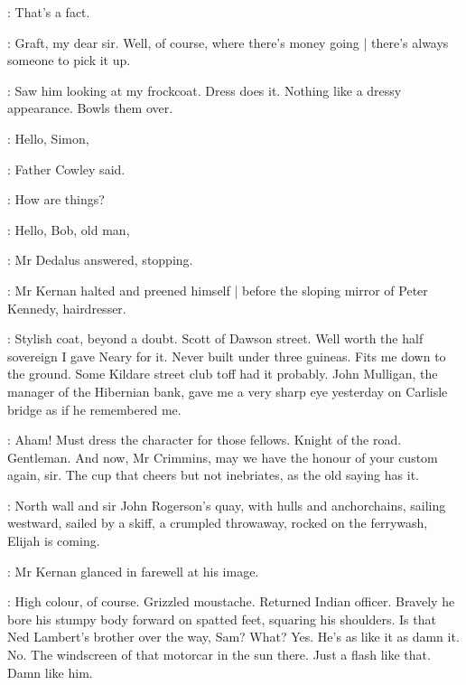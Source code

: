 \crimmins:
That's a fact.

:
Graft,
my dear sir.
Well, of course, where there's money going |
there's always someone to pick it up.

:
Saw him looking at my frockcoat.
Dress does it.
Nothing like a dressy appearance.
Bowls them over.

\begin{interject}
    \cowley:
    Hello, Simon,

    :
    Father Cowley said.

    \cowley:
    How are things?

    \simon:
    Hello, Bob, old man,

    :
    Mr Dedalus answered,
    stopping.

\end{interject}

:
Mr Kernan halted and preened himself |
before the sloping mirror of Peter Kennedy, hairdresser.

:
Stylish coat, beyond a doubt.
Scott of Dawson street.
Well worth the half sovereign I gave Neary for it.
Never built under three guineas.
Fits me down to the ground.
Some Kildare street club toff had it probably.
John Mulligan, the manager of the Hibernian bank,
gave me a very sharp eye yesterday
on Carlisle bridge as if he remembered me.

:
Aham!
Must dress the character for those fellows.
Knight of the road.
Gentleman.
And now, Mr Crimmins,
may we have the honour of your custom again, sir.
The cup that cheers but not inebriates,
as the old saying has it.

\begin{interject}
    :
    North wall and sir John Rogerson's quay,
    with hulls and anchorchains,
    sailing westward,
    sailed by a skiff,
    a crumpled throwaway,
    rocked on the ferrywash,
    Elijah is coming.
\end{interject}

:
Mr Kernan glanced in farewell at his image.

:
High colour, of course.
Grizzled moustache.
Returned Indian officer.
Bravely he bore his stumpy body forward on spatted feet,
squaring his shoulders.
Is that Ned Lambert's brother over the way, Sam?
What?
Yes.
He's as like it as damn it.
No.
The windscreen of that motorcar in the sun there.
Just a flash like that.
Damn like him.%

